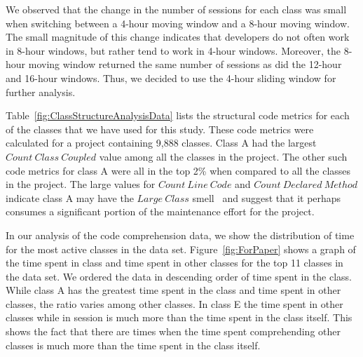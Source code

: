 We observed that the change in the number of sessions for each class was small when switching between a 4-hour moving window and a 8-hour moving window. The small magnitude of this change indicates that developers do not often work in 8-hour windows, but rather tend to work in 4-hour windows. Moreover, the 8-hour moving window returned the same number of sessions as did the 12-hour and 16-hour windows. Thus, we decided to use the 4-hour sliding window for further analysis.

Table~\ref{fig:ClassStructureAnalysisData} lists the structural code metrics for each of the classes that we have used for this study.  These code metrics were calculated for a project containing 9,888 classes. Class A had the largest $Count~Class~Coupled$ value among all the classes in the project. The other such code metrics for class A were all in the top 2\% when compared to all the classes in the project.
The large values for $Count~Line~Code$ and $Count~Declared~Method$ indicate class A may have the $Large~Class$ smell~\cite{Fowler_etal:1999} and suggest that it perhaps consumes a significant portion of the maintenance effort for the project. 

In our analysis of the code comprehension data, we show the distribution of time for the most active classes in the data set. Figure~\ref{fig:ForPaper} shows a graph of the time spent in class and time spent in other classes for the top 11 classes in the data set. We ordered the data in descending order of time spent in the class. While class A has the greatest time spent in the class and time spent in other classes, the ratio varies among other classes.  In class E  the time spent in other classes while in session is much more than the time spent in the class itself. This shows the fact that there are times when the time spent comprehending other classes is much more than the time spent in the class itself. 

